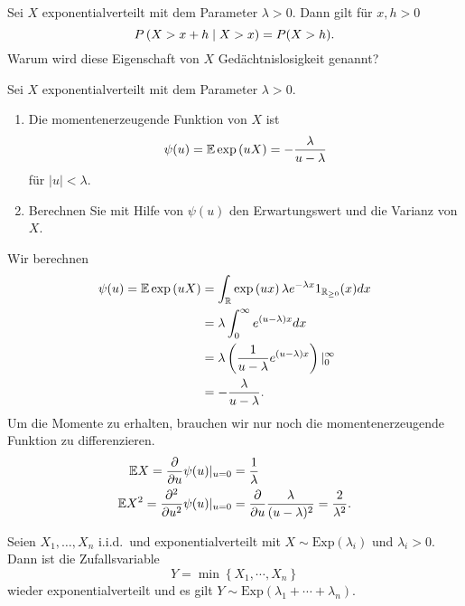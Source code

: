 Sei $X$ exponentialverteilt mit dem Parameter $\lambda>0$. Dann gilt für
$x,h>0$ 
\begin{equation*}
    P\left( X > x+h \;\middle\vert\; X > x \right) = P( X > h).
\end{equation*}
Warum wird diese Eigenschaft von $X$ Gedächtnislosigkeit genannt?

Sei $X$ exponentialverteilt mit dem Parameter $\lambda>0$. 
\begin{enumerate}
    \item Die momentenerzeugende Funktion von $X$ ist 
        \begin{equation*}
            \psi (u) = \mathbb{E} \exp \left( u X \right) = - \frac{\lambda}{u - \lambda}
        \end{equation*}
        für $|u| < \lambda$. 
    \item Berechnen Sie mit Hilfe von $\psi(u)$ den Erwartungswert und die Varianz von $X$. 
\end{enumerate}
\solution 
Wir berechnen
\begin{align*}
    \psi(u) = \mathbb{E} \exp \left( u X \right) &= 
    \int_{\mathbb{R}}^{} \exp \left( ux \right) \lambda e^{-\lambda x} 1_{\mathbb{R}_{\geq 0}}(x) dx \\
    &= \lambda \int_{0}^{\infty} e^{(u-\lambda)x} dx \\
    &= \lambda \left( \frac{1}{u-\lambda} e^{(u-\lambda)x} \right) |_{0}^{\infty}\\
    &= -\frac{\lambda}{u- \lambda}. 
\end{align*}
Um die Momente zu erhalten, brauchen wir nur noch die momentenerzeugende Funktion 
zu differenzieren. 
\begin{align*}
    \mathbb{E} X = \frac{\partial}{ \partial u} \psi (u) |_{u=0} &= \frac{1}{\lambda} \\
    \mathbb{E} X^2 = \frac{\partial^2}{\partial u^2} \psi (u) |_{u=0} &=
    \frac{\partial}{\partial u} \frac{\lambda}{(u-\lambda)^2} = \frac{2}{\lambda^2}. 
\end{align*}

Seien $X_1, \dots, X_n$ i.i.d.\ und exponentialverteilt mit $X\sim \text{Exp}(\lambda_i)$
und $\lambda_i>0$. Dann ist die Zufallsvariable 
\begin{equation*}
    Y = \min \left\{ X_1, \cdots, X_n \right\} 
\end{equation*}
wieder exponentialverteilt und es gilt $Y \sim
\text{Exp}(\lambda_1+\cdots+\lambda_n)$.

